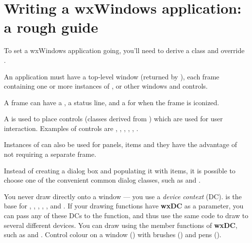 \section{Writing a wxWindows application: a rough guide}\label{roughguide}

To set a wxWindows application going, you'll need to derive a  class and
override .

An application must have a top-level  window (returned by ),
each frame containing one or more instances of , \rtfsp
or other windows and controls.

A frame can have a , a status line, and a  for
when the frame is iconized.

A  is used to place controls (classes derived from )
which are used for user interaction. Examples of controls are ,
\rtfsp{}, , ,
\rtfsp{}, .

Instances of  can also be used for panels, items and they have
the advantage of not requiring a separate frame.

Instead of creating a dialog box and populating it with items, it is possible to choose
one of the convenient common dialog classes, such as \rtfsp
and .

You never draw directly onto a window --- you use a {\it device context} (DC).  is
the base for , , , ,
\rtfsp{},  and .
If your drawing functions have {\bf wxDC} as a parameter, you can pass any of these DCs
to the function, and thus use the same code to draw to several different devices.
You can draw using the member functions of {\bf wxDC}, such as \rtfsp
and . Control colour on a window () with
brushes () and pens ().

